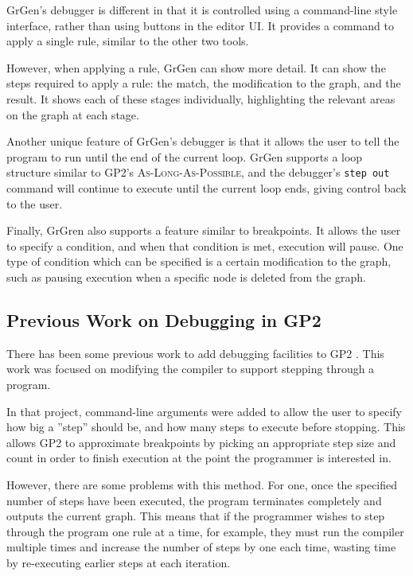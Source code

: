 \documentclass[authoryearcitations]{UoYCSproject}
\begin{document}
GrGen's debugger is different in that it is controlled using a command-line style
interface, rather than using buttons in the editor UI. It provides a command to
apply a single rule, similar to the other two tools.

However, when applying a rule, GrGen can show more detail. It can show the steps
required to apply a rule: the match, the modification to the graph, and the result.
It shows each of these stages individually, highlighting the relevant areas on the
graph at each stage.

Another unique feature of GrGen's debugger is that it allows the user to tell the
program to run until the end of the current loop. GrGen supports a loop structure
similar to GP2's \textsc{As-Long-As-Possible}, and the debugger's \texttt{step out}
command will continue to execute until the current loop ends, giving control back
to the user.

Finally, GrGren also supports a feature similar to breakpoints. It allows the user
to specify a condition, and when that condition is met, execution will pause. One
type of condition which can be specified is a certain modification to the graph,
such as pausing execution when a specific node is deleted from the graph.


\subsection{Previous Work on Debugging in GP2}
\label{sec:PreviousWorkOnDebuggingInGP2}

There has been some previous work to add debugging facilities to GP2 \citep{taylor2016}.
This work was focused on modifying the compiler to support stepping through a
program.

In that project, command-line arguments were added to allow the user to specify
how big a ''step'' should be, and how many steps to execute before stopping.
This allows GP2 to approximate breakpoints by picking an appropriate step size
and count in order to finish execution at the point the programmer is interested in.

However, there are some problems with this method. For one, once the specified
number of steps have been executed, the program terminates completely and outputs
the current graph. This means that if the programmer wishes to step through the
program one rule at a time, for example, they must run the compiler multiple times
and increase the number of steps by one each time, wasting time by re-executing
earlier steps at each iteration.
\end{document}
